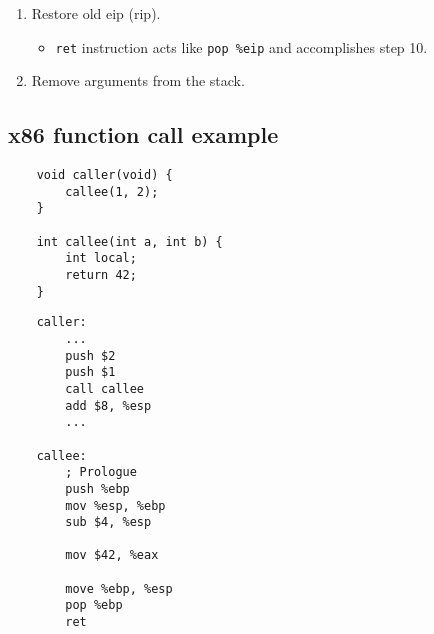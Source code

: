 \begin{enumerate}
    \item Restore old eip (rip).
    \begin{itemize}
        \item \texttt{ret} instruction acts like \texttt{pop \%eip} and accomplishes step 10.
    \end{itemize}
    
    \item Remove arguments from the stack.
\end{enumerate}

\subsection{x86 function call example}
\begin{multicols}{2}
	\begin{verbatim}
    void caller(void) {
        callee(1, 2);
    }
    
    int callee(int a, int b) {
        int local;
        return 42;
    }
	\end{verbatim}
	
	\columnbreak
	
	\begin{verbatim}
	caller:
    	...
    	push $2
    	push $1
    	call callee
    	add $8, %esp
    	...
	
	callee:
    	; Prologue
    	push %ebp
    	mov %esp, %ebp
    	sub $4, %esp
    	
    	mov $42, %eax
    	
    	move %ebp, %esp
    	pop %ebp
    	ret
	\end{verbatim}
\end{multicols}